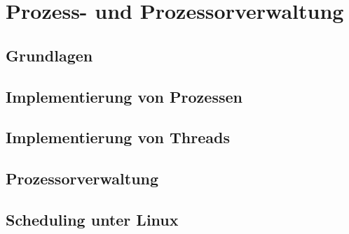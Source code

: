 \section{Prozess- und Prozessorverwaltung}

\subsection{Grundlagen}

\subsection{Implementierung von Prozessen}

\subsection{Implementierung von Threads}

\subsection{Prozessorverwaltung}

\subsection{Scheduling unter Linux}
